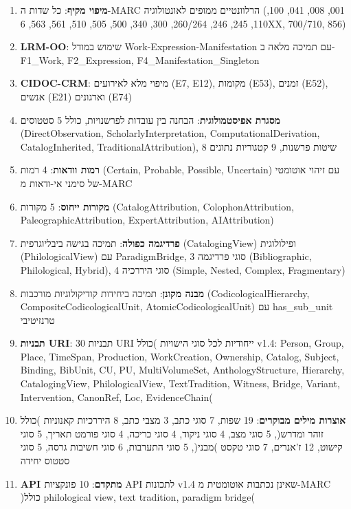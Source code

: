 \documentclass[12pt,a4paper]{article}
\begin{document}
\begin{enumerate}
\item \textbf{מיפוי מקיף}: כל שדות ה-MARC הרלוונטיים ממופים לאונטולוגיה \textenglish{(001, 008, 041, 100, 110, 245, 246, 260/264, 300, 340, 500, 505, 510, 561, 563, 6XX, 700/710, 856)}
\item \textbf{LRM-OO}: שימוש במודל Work-Expression-Manifestation עם תמיכה מלאה ב-F1\_Work, F2\_Expression, F4\_Manifestation\_Singleton
\item \textbf{CIDOC-CRM}: מיפוי מלא לאירועים \textenglish{(E7, E12)}, מקומות \textenglish{(E53)}, זמנים \textenglish{(E52)}, אנשים \textenglish{(E21)} וארגונים \textenglish{(E74)}
\item \textbf{מסגרת אפיסטמולוגית}: הבחנה בין עובדות לפרשנויות, כולל 5 סטטוסים \textenglish{(DirectObservation, ScholarlyInterpretation, ComputationalDerivation, CatalogInherited, TraditionalAttribution)}, 8 שיטות פרשנות, 9 קטגוריות נתונים
\item \textbf{רמות וודאות}: 4 רמות \textenglish{(Certain, Probable, Possible, Uncertain)} עם זיהוי אוטומטי של סימני אי-ודאות מ-MARC
\item \textbf{מקורות ייחוס}: 5 מקורות \textenglish{(CatalogAttribution, ColophonAttribution, PaleographicAttribution, ExpertAttribution, AIAttribution)}
\item \textbf{פרדיגמה כפולה}: תמיכה בגישה ביבליוגרפית \textenglish{(CatalogingView)} ופילולוגית \textenglish{(PhilologicalView)} עם ParadigmBridge, 3 סוגי פרדיגמה \textenglish{(Bibliographic, Philological, Hybrid)}, 4 סוגי היררכיה \textenglish{(Simple, Nested, Complex, Fragmentary)}
\item \textbf{מבנה מקונן}: תמיכה ביחידות קודיקולוגיות מורכבות \textenglish{(CodicologicalHierarchy, CompositeCodicologicalUnit, AtomicCodicologicalUnit)} עם \textenglish{has\_sub\_unit} טרנזיטיבי
\item \textbf{תבניות URI}: 30 תבניות URI ייחודיות לכל סוגי הישויות )כולל v1.4: Person, Group, Place, TimeSpan, Production, WorkCreation, Ownership, Catalog, Subject, Binding, BibUnit, CU, PU, MultiVolumeSet, AnthologyStructure, Hierarchy, CatalogingView, PhilologicalView, TextTradition, Witness, Bridge, Variant, Intervention, CanonRef, Loc, EvidenceChain(
\item \textbf{אוצרות מילים מבוקרים}: 19 שפות, 7 סוגי כתב, 3 מצבי כתב, 8 היררכיות קאנוניות )כולל זוהר ומדרש(, 5 סוגי מצב, 4 סוגי ניקוד, 4 סוגי כריכה, 4 סוגי פורמט תאריך, 5 סוגי קישוט, 12 ז'אנרים, 7 סוגי טקסט )מבני(, 5 סוגי התערבות, 6 סוגי חשיבות גרסה, 5 סוגי סטטוס יחידה
\item \textbf{API מתקדם}: 10 פונקציות API לתכונות v1.4 שאינן נכתבות אוטומטית מ-MARC )כולל philological view, text tradition, paradigm bridge(

\end{enumerate}
\end{document}
